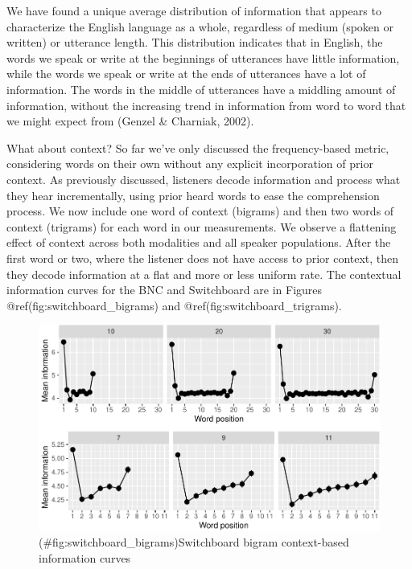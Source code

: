 \documentclass[11pt,]{article}
\begin{document}
We have found a unique average distribution of information that appears to characterize the English language as a whole, regardless of medium (spoken or written) or utterance length. This distribution indicates that in English, the words we speak or write at the beginnings of utterances have little information, while the words we speak or write at the ends of utterances have a lot of information. The words in the middle of utterances have a middling amount of information, without the increasing trend in information from word to word that we might expect from (Genzel \& Charniak, 2002).

What about context? So far we've only discussed the frequency-based metric, considering words on their own without any explicit incorporation of prior context. As previously discussed, listeners decode information and process what they hear incrementally, using prior heard words to ease the comprehension process. We now include one word of context (bigrams) and then two words of context (trigrams) for each word in our measurements. We observe a flattening effect of context across both modalities and all speaker populations. After the first word or two, where the listener does not have access to prior context, then they decode information at a flat and more or less uniform rate. The contextual information curves for the BNC and Switchboard are in Figures @ref(fig:switchboard\_bigrams) and @ref(fig:switchboard\_trigrams).

\begin{figure}
\centering
\includegraphics{paper_files/figure-latex/switchboard_bigrams-1.pdf}
\caption{(\#fig:switchboard\_bigrams)Switchboard bigram context-based information curves}
\end{figure}
\end{document}
